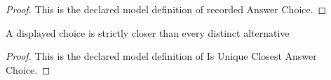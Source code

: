 \begin{proof}
  This is the declared model definition of recorded Answer Choice.
\end{proof}
\begin{definition}
  \label{def:physics:phyx-mini-0282:phyxminiproblems-problemphyxmini0282-isuniqueclosestanswerchoice}
  A displayed choice is strictly closer than every distinct alternative
\end{definition}
\begin{proof}
  This is the declared model definition of Is Unique Closest Answer Choice.
\end{proof}
